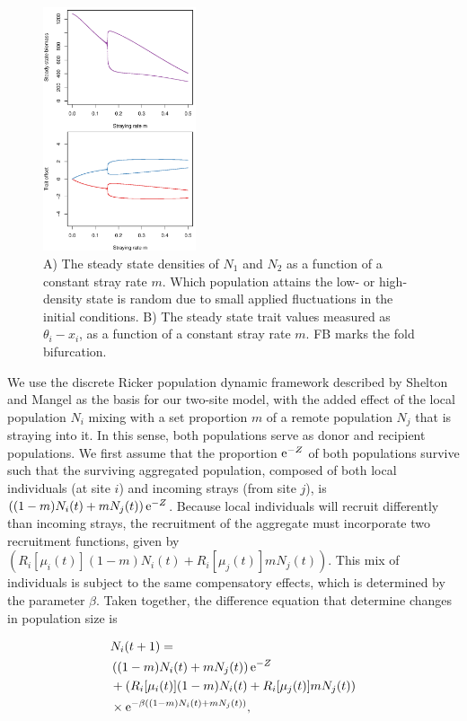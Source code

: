 \documentclass[twocolumn,preprintnumbers,amsmath,amssymb,superscriptaddress]{revtex4}
\begin{document}
\begin{figure}
  \captionsetup{justification=raggedright,
singlelinecheck=false
}
\centering
\includegraphics[width=0.4\textwidth]{figs2/fig_traj.pdf}
\caption{
A) The steady state densities of $N_1$ and $N_2$ as a function of a constant stray rate $m$. Which population attains the low- or high-density state is random due to small applied fluctuations in the initial conditions.
B) The steady state trait values measured as $\theta_i - x_i$, as a function of a constant stray rate $m$. 
FB marks the fold bifurcation.
} \label{fig:traj}
\end{figure}

We use the discrete Ricker population dynamic framework described by Shelton and Mangel \cite{Shelton:2011eq} as the basis for our two-site model, with the added effect of the local population $N_i$ mixing with a set proportion $m$ of a remote population $N_j$ that is straying into it.
In this sense, both populations serve as donor and recipient populations.
We first assume that the proportion ${\rm e}^{-Z}$ of both populations survive such that the surviving aggregated population, composed of both local individuals (at site $i$) and incoming strays (from site $j$), is $\left((1-m)N_i(t) + m N_j(t) \right){\rm e}^{-Z}$.
Because local individuals will recruit differently than incoming strays, the recruitment of the aggregate must incorporate two recruitment functions, given by $\left(R_i[\mu_i(t)] (1-m)N_i(t) + R_i[\mu_j(t)] m N_j(t)\right)$.
This mix of individuals is subject to the same compensatory effects, which is determined by the parameter $\beta$.
Taken together, the difference equation that determine changes in population size is

\begin{align}
  &N_i(t+1) = \\ \nonumber
  &\left((1-m)N_i(t) + m N_j(t) \right){\rm e}^{-Z} \\ \nonumber
  &+ \left(R_i[\mu_i(t)] (1-m)N_i(t) + R_i[\mu_j(t)] m N_j(t)\right) \\ \nonumber
  &\times {\rm e}^{-\beta ((1-m)N_i(t) + m N_j(t))},
  \label{eq:N}
\end{align}
\end{document}
